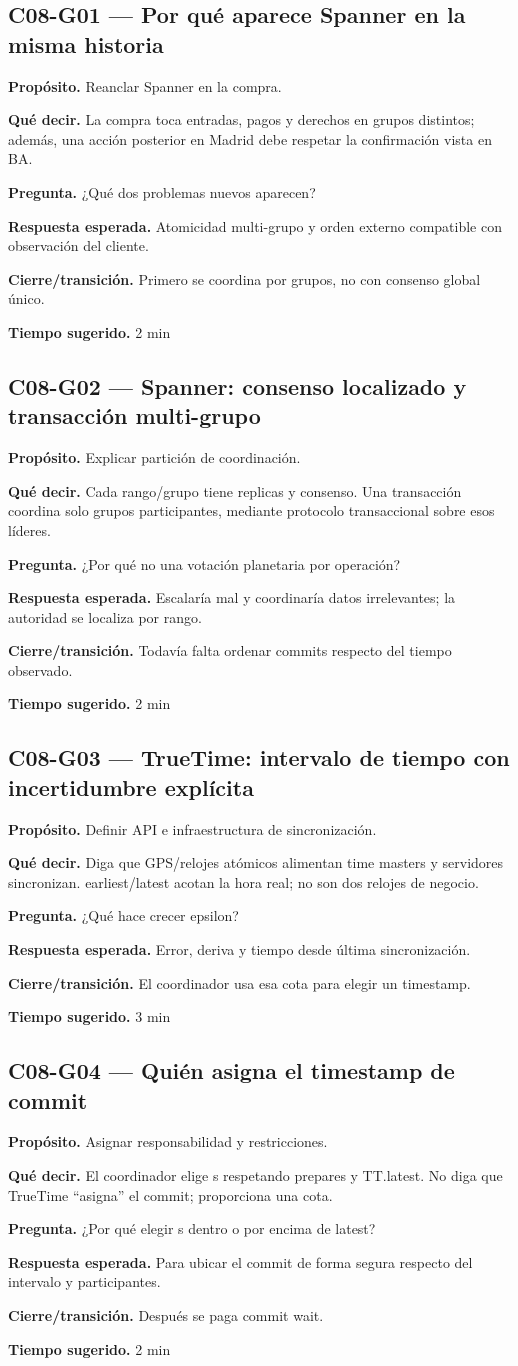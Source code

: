 \documentclass[variant=docente,cover=institutional,mode=screen]{ua-engineering-v6-article}
\newcommand{\FrameField}[2]{\par\noindent\textbf{#1.} #2\par}
\begin{document}
\subsection*{C08-G01 --- Por qué aparece Spanner en la misma historia}
\FrameField{Propósito}{Reanclar Spanner en la compra.}
\FrameField{Qué decir}{La compra toca entradas, pagos y derechos en grupos distintos; además, una acción posterior en Madrid debe respetar la confirmación vista en BA.}
\FrameField{Pregunta}{¿Qué dos problemas nuevos aparecen?}
\FrameField{Respuesta esperada}{Atomicidad multi-grupo y orden externo compatible con observación del cliente.}
\FrameField{Cierre/transición}{Primero se coordina por grupos, no con consenso global único.}
\FrameField{Tiempo sugerido}{2 min}

\subsection*{C08-G02 --- Spanner: consenso localizado y transacción multi-grupo}
\FrameField{Propósito}{Explicar partición de coordinación.}
\FrameField{Qué decir}{Cada rango/grupo tiene replicas y consenso. Una transacción coordina solo grupos participantes, mediante protocolo transaccional sobre esos líderes.}
\FrameField{Pregunta}{¿Por qué no una votación planetaria por operación?}
\FrameField{Respuesta esperada}{Escalaría mal y coordinaría datos irrelevantes; la autoridad se localiza por rango.}
\FrameField{Cierre/transición}{Todavía falta ordenar commits respecto del tiempo observado.}
\FrameField{Tiempo sugerido}{2 min}

\subsection*{C08-G03 --- TrueTime: intervalo de tiempo con incertidumbre explícita}
\FrameField{Propósito}{Definir API e infraestructura de sincronización.}
\FrameField{Qué decir}{Diga que GPS/relojes atómicos alimentan time masters y servidores sincronizan. earliest/latest acotan la hora real; no son dos relojes de negocio.}
\FrameField{Pregunta}{¿Qué hace crecer epsilon?}
\FrameField{Respuesta esperada}{Error, deriva y tiempo desde última sincronización.}
\FrameField{Cierre/transición}{El coordinador usa esa cota para elegir un timestamp.}
\FrameField{Tiempo sugerido}{3 min}

\subsection*{C08-G04 --- Quién asigna el timestamp de commit}
\FrameField{Propósito}{Asignar responsabilidad y restricciones.}
\FrameField{Qué decir}{El coordinador elige s respetando prepares y TT.latest. No diga que TrueTime “asigna” el commit; proporciona una cota.}
\FrameField{Pregunta}{¿Por qué elegir s dentro o por encima de latest?}
\FrameField{Respuesta esperada}{Para ubicar el commit de forma segura respecto del intervalo y participantes.}
\FrameField{Cierre/transición}{Después se paga commit wait.}
\FrameField{Tiempo sugerido}{2 min}
\end{document}
